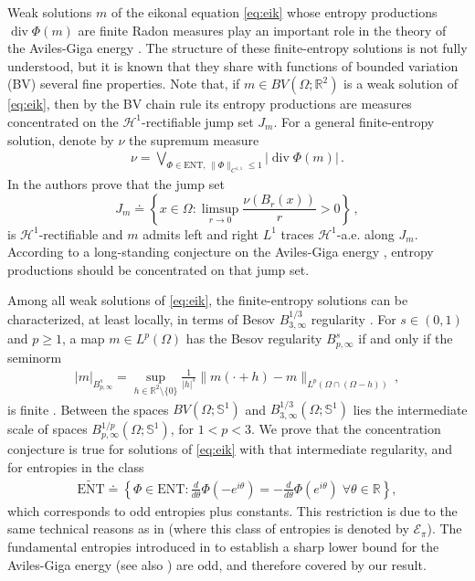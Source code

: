 \documentclass[fleqn
]{article}
\numberwithin{equation}{section}
\newcommand{\R}{{\mathbb R}}
\DeclareMathOperator{\dv}{div}
\theoremstyle{definition}
\begin{document}
Weak solutions $m$ of the eikonal equation \eqref{eq:eik}
 whose entropy productions $\dv\Phi(m)$ are finite Radon measures play an important role in the theory of the Aviles-Giga energy \cite{avilesgiga99}. 
%
The structure of these finite-entropy solutions
 is not fully understood,
 but it is known that they share with functions of bounded variation (BV) several fine properties.
Note that, if $m\in BV(\Omega;\R^2)$ is a weak solution of \eqref{eq:eik}, 
then by the BV chain rule its entropy productions are measures concentrated on the $\mathcal H^1$-rectifiable jump set $J_m$.
For a general finite-entropy solution, denote by
$\nu$ the supremum measure
\begin{align*}
\nu =\bigvee_{\Phi\in\mathrm{ENT},\,\|\Phi\|_{C^{1,1}}\leq 1}|\dv\Phi(m)|\,.
\end{align*}
 In \cite{ODL03} the authors prove that
 the jump set 
\begin{equation}\label{e:defJ}
J_m \doteq \left\{  x \in \Omega : \limsup_{r\to 0}\frac{\nu(B_r(x))}{r}>0 \right\}\,,
\end{equation}
is $\mathcal H^1$-rectifiable and
 $m$ admits left and right $L^1$ traces $\mathcal H^1$-a.e. along $J_m$.
According to a long-standing conjecture on the Aviles-Giga energy \cite{avilesgiga99},
entropy productions should be concentrated on that jump set.


Among all weak solutions of \eqref{eq:eik}, 
the finite-entropy solutions can be characterized, at least locally, in terms of Besov $B^{1/3}_{3,\infty}$ regularity \cite{GL20}.
For $s\in (0,1)$ and $p\geq 1$, a map $m\in L^p(\Omega)$ has 
the Besov regularity $B^{s}_{p,\infty}$ if and only if the seminorm
\begin{align*}
|m|_{B^{s}_{p,\infty}} = \sup_{h\in\R^2\setminus\lbrace 0\rbrace} 
\frac{1}{|h|^s}\|m(\cdot +h)-m\|_{L^p(\Omega\cap(\Omega -h))}\,,
\end{align*}
is finite \cite[]{triebel83}.
Between the spaces $BV(\Omega;\mathbb S^1)$ and $B^{1/3}_{3,\infty}(\Omega;\mathbb S^1)$ lies the intermediate scale of spaces
$B^{1/p}_{p,\infty}(\Omega;\mathbb S^1)$, for $1<p<3$.
We prove that the concentration conjecture is true for solutions of \eqref{eq:eik} with that intermediate regularity,
and for entropies in the class
\begin{align}\label{eq:tildeENT}
\widetilde{\mathrm{ENT}} \doteq \left\{  \Phi \in \mathrm{ENT}: \frac{d}{d\theta}\Phi(-e^{i\theta})= - \frac{d}{d\theta}\Phi(e^{i\theta})
\;\forall\theta\in\R\right\},
\end{align}
which corresponds to odd entropies plus constants.
This restriction is due to the same technical reasons as in \cite{marconi21ellipse} (where this class of entropies is denoted by $\mathcal E_\pi$).
The fundamental entropies introduced in \cite{JK00} to establish a sharp lower bound for the Aviles-Giga energy (see also \cite{ADM}) are odd, and therefore covered by our result.
\end{document}
